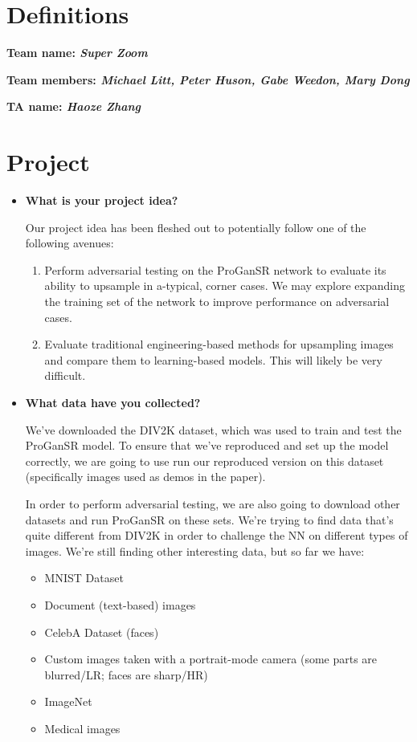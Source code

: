 \section*{Definitions}

\textbf{Team name: \emph{Super Zoom}}

\textbf{Team members: \emph{Michael Litt, Peter Huson, Gabe Weedon, Mary Dong}}

\textbf{TA name: \emph{Haoze Zhang}}

\section*{Project}
\begin{itemize}
  \item \textbf{What is your project idea?}
  
  Our project idea has been fleshed out to potentially follow one of the following avenues: 
  \begin{enumerate}
    \item Perform adversarial testing on the ProGanSR network to evaluate its ability to upsample in a-typical, corner cases. 
        \subitem We may explore expanding the training set of the network to improve performance on adversarial cases.  
    \item Evaluate traditional engineering-based methods for upsampling images and compare them to learning-based models. This will likely be very difficult.  
  \end{enumerate}
  
  
  \item \textbf{What data have you collected?}
  
  We've downloaded the DIV2K dataset, which was used to train and test the ProGanSR model. To ensure that we've reproduced and set up the model correctly, we are going to use run our reproduced version on this dataset (specifically images used as demos in the paper).
  
  In order to perform adversarial testing, we are also going to download other datasets and run ProGanSR on these sets. We're trying to find data that's quite different from DIV2K in order to challenge the NN on different types of images. We're still finding other interesting data, but so far we have:
  \begin{itemize}
      \item MNIST Dataset
      \item Document (text-based) images
      \item CelebA Dataset (faces)
      \item Custom images taken with a portrait-mode camera (some parts are blurred/LR; faces are sharp/HR)
      \item ImageNet
      \item Medical images
  \end{itemize}
  

\end{itemize}
